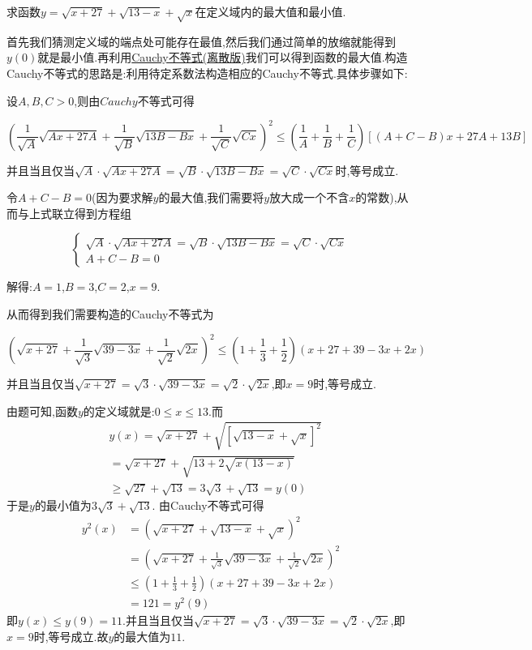 \documentclass[../../main.tex]{subfiles}%
\begin{document}
\begin{example}
求函数$y=\sqrt{x+27}+\sqrt{13-x}+\sqrt{x}$在定义域内的最大值和最小值.
\end{example}
\begin{note}
首先我们猜测定义域的端点处可能存在最值,然后我们通过简单的放缩就能得到$y(0)$就是最小值.再利用\hyperref[theorem:Cauchy不等式(离散版)]{Cauchy不等式(离散版)}我们可以得到函数的最大值.构造Cauchy不等式的思路是:利用待定系数法构造相应的Cauchy不等式.具体步骤如下:

设\(A,B,C > 0\),则由\(Cauchy\)不等式可得

\[
\left(\frac{1}{\sqrt{A}}\sqrt{Ax + 27A} + \frac{1}{\sqrt{B}}\sqrt{13B - Bx} + \frac{1}{\sqrt{C}}\sqrt{Cx}\right)^2 \leqslant \left(\frac{1}{A} + \frac{1}{B} + \frac{1}{C}\right)[(A + C - B)x + 27A + 13B]
\]

并且当且仅当\(\sqrt{A} \cdot \sqrt{Ax + 27A} = \sqrt{B} \cdot \sqrt{13B - Bx} = \sqrt{C} \cdot \sqrt{Cx}\)时,等号成立.

令\(A + C - B = 0\)(因为要求解\(y\)的最大值,我们需要将\(y\)放大成一个不含\(x\)的常数),从而与上式联立得到方程组

\[
\begin{cases}
\sqrt{A} \cdot \sqrt{Ax + 27A} = \sqrt{B} \cdot \sqrt{13B - Bx} = \sqrt{C} \cdot \sqrt{Cx}\\
A + C - B = 0
\end{cases}
\]

解得:\(A = 1\),\(B = 3\),\(C = 2\),\(x = 9\).

从而得到我们需要构造的Cauchy不等式为

\[
\left(\sqrt{x + 27} + \frac{1}{\sqrt{3}}\sqrt{39 - 3x} + \frac{1}{\sqrt{2}}\sqrt{2x}\right)^2 \leqslant \left(1 + \frac{1}{3} + \frac{1}{2}\right)(x + 27 + 39 - 3x + 2x)
\]

并且当且仅当\(\sqrt{x + 27} = \sqrt{3} \cdot \sqrt{39 - 3x} = \sqrt{2} \cdot \sqrt{2x}\),即\(x = 9\)时,等号成立. 
\end{note}
\begin{solution}
由题可知,函数\(y\)的定义域就是:\(0 \leqslant x \leqslant 13\).而
\begin{align*}
&y(x) = \sqrt{x + 27} + \sqrt{[\sqrt{13 - x} + \sqrt{x}]^2}
\\
&= \sqrt{x + 27} + \sqrt{13 + 2\sqrt{x(13 - x)}}
\\
&\geqslant \sqrt{27} + \sqrt{13} = 3\sqrt{3} + \sqrt{13} = y(0)
\end{align*}
于是\(y\)的最小值为\(3\sqrt{3} + \sqrt{13}\).
由Cauchy不等式可得
\begin{align*}
y^2(x) &= (\sqrt{x + 27} + \sqrt{13 - x} + \sqrt{x})^2\\
&= (\sqrt{x + 27} + \frac{1}{\sqrt{3}}\sqrt{39 - 3x} + \frac{1}{\sqrt{2}}\sqrt{2x})^2\\
&\leqslant (1 + \frac{1}{3} + \frac{1}{2})(x + 27 + 39 - 3x + 2x)\\
&= 121 = y^2(9)
\end{align*}
即\(y(x) \leqslant y(9) = 11\).并且当且仅当\(\sqrt{x + 27} = \sqrt{3} \cdot \sqrt{39 - 3x} = \sqrt{2} \cdot \sqrt{2x}\),即\(x = 9\)时,等号成立.故\(y\)的最大值为\(11\). 

\end{solution}
\end{document}
